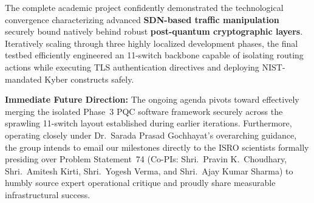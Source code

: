 \documentclass[12pt]{article}
\begin{document}
The complete academic project confidently demonstrated the technological convergence characterizing advanced \textbf{SDN-based traffic manipulation} securely bound natively behind robust \textbf{post-quantum cryptographic layers}. Iteratively scaling through three highly localized development phases, the final testbed efficiently engineered an 11-switch backbone capable of isolating routing actions while executing TLS authentication directives and deploying NIST-mandated Kyber constructs safely.

\textbf{Immediate Future Direction:} The ongoing agenda pivots toward effectively merging the isolated Phase~3 PQC software framework securely across the sprawling 11-switch layout established during earlier iterations. Furthermore, operating closely under Dr.\ Sarada Prasad Gochhayat's overarching guidance, the group intends to email our milestones directly to the ISRO scientists formally presiding over Problem Statement~74 (Co-PIs: Shri.\ Pravin K.\ Choudhary, Shri.\ Amitesh Kirti, Shri.\ Yogesh Verma, and Shri.\ Ajay Kumar Sharma) to humbly source expert operational critique and proudly share measurable infrastructural success.

\end{document}
